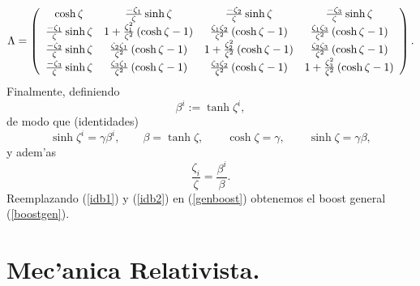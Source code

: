 \begin{equation}
\Lambda=\left(
\begin{array}
[c]{cccc}
\cosh\zeta & \frac{-\zeta_1}{\zeta}\sinh\zeta & \frac
{-\zeta_2}{\zeta}\sinh\zeta & \frac{-\zeta_3}{\zeta
}\sinh\zeta\\
\frac{-\zeta_1}{\zeta}\sinh\zeta & 1+\frac{\zeta_1^2}{\zeta^2}\left(  \cosh\zeta-1\right)  & \frac{\zeta_1\zeta_2}{\zeta
^2}\left(  \cosh\zeta-1\right)  & \frac{\zeta_1\zeta_3}{\zeta^2}\left(  \cosh\zeta-1\right) \\
\frac{-\zeta_2}{\zeta}\sinh\zeta & \frac{\zeta_2\zeta_1}{\zeta^2}\left(  \cosh\zeta-1\right)  & 1+\frac{\zeta_2^2}{\zeta^2}\left(  \cosh\zeta-1\right)  & \frac{\zeta_2\zeta_3}{\zeta^2}\left(
\cosh\zeta-1\right) \\
\frac{-\zeta_3}{\zeta}\sinh\zeta & \frac{\zeta_3\zeta_1}{\zeta^2}\left(  \cosh\zeta-1\right)  & \frac{\zeta_3\zeta_2}{\zeta
^2}\left(  \cosh\zeta-1\right)  & 1+\frac{\zeta_3^2}{\zeta^2}\left(
\cosh\zeta-1\right) \label{genboost}
\end{array}
\right).
\end{equation}
Finalmente, definiendo
\begin{equation}
\beta^i :=\tanh\zeta^i,
\end{equation}
de modo que (identidades)
\begin{equation}
\sinh\zeta^i =\gamma\beta^i, \qquad \beta   =\tanh\zeta, \qquad
\cosh\zeta  =\gamma, \qquad \sinh\zeta  =\gamma\beta, \label{idb1}
\end{equation}
y adem'as
\begin{equation}
\frac{\zeta_i}{\zeta}=\frac{\beta^i}{\beta}. \label{idb2}
\end{equation}
Reemplazando (\ref{idb1}) y (\ref{idb2}) en (\ref{genboost}) obtenemos el boost general (\ref{boostgen}).


\section{Mec'anica Relativista.}
